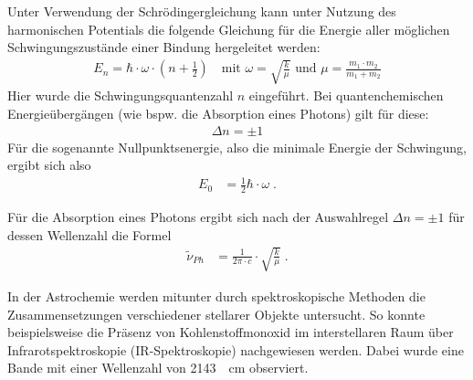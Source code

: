 \documentclass[../main.tex]{subfiles}
\begin{document}
Unter Verwendung der Schrödingergleichung kann unter Nutzung des harmonischen Potentials die folgende Gleichung für die Energie aller möglichen Schwingungszustände einer Bindung hergeleitet werden:
\begin{align}
    E_n = \hbar\cdot\omega\cdot\left(n+\frac{1}{2}\right)\quad\text{mit }\omega = \sqrt{\frac{k}{\mu}}\text{ und }\mu=\frac{m_1\cdot m_2}{m_1+m_2}
\end{align}
Hier wurde die Schwingungsquantenzahl \(n\) eingeführt. Bei quantenchemischen Energieübergängen (wie bspw. die Absorption eines Photons) gilt für diese:
\begin{align}
    \Delta n = \pm1
\end{align}
Für die sogenannte Nullpunktsenergie, also die minimale Energie der Schwingung, ergibt sich also
\begin{align}
    E_0 &= \frac{1}{2}\hbar\cdot\omega\;.
\end{align}

Für die Absorption eines Photons ergibt sich nach der Auswahlregel $\Delta n=\pm 1$ für dessen Wellenzahl die Formel
\begin{align}\label{eq:nu_Ph}
    \tilde\nu_{Ph} &= \frac{1}{2\pi\cdot c}\cdot \sqrt{\frac{k}{\mu}}\;.
\end{align}


In der Astrochemie werden mitunter durch spektroskopische Methoden die Zusammensetzungen verschiedener stellarer Objekte untersucht. So konnte beispielsweise die Präsenz von Kohlenstoffmonoxid im interstellaren Raum über Infrarotspektroskopie (IR-Spektroskopie) nachgewiesen werden. Dabei wurde eine Bande mit einer Wellenzahl von \SI{2143}{\per\centi\metre} observiert.
\end{document}
